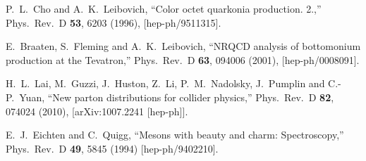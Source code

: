 \documentclass[aps,prc,preprint,superscriptaddress,showpacs,showkeys,amsmath]{revtex4-1}
\begin{document}
\begin{thebibliography}{100}
  P.~L.~Cho and A.~K.~Leibovich,
  ``Color octet quarkonia production. 2.,''
  Phys.\ Rev.\ D {\bf 53}, 6203 (1996),
  [hep-ph/9511315].

  E.~Braaten, S.~Fleming and A.~K.~Leibovich,
  ``NRQCD analysis of bottomonium production at the Tevatron,''
  Phys.\ Rev.\ D {\bf 63}, 094006 (2001),
  [hep-ph/0008091].


  H.~L.~Lai, M.~Guzzi, J.~Huston, Z.~Li, P.~M.~Nadolsky, J.~Pumplin and C.-P.~Yuan,
  ``New parton distributions for collider physics,''
  Phys.\ Rev.\ D {\bf 82}, 074024 (2010),
  [arXiv:1007.2241 [hep-ph]].

  E.~J.~Eichten and C.~Quigg,
  ``Mesons with beauty and charm: Spectroscopy,''
  Phys.\ Rev.\ D {\bf 49}, 5845 (1994)
  [hep-ph/9402210].



 






\end{thebibliography}
\end{document}
